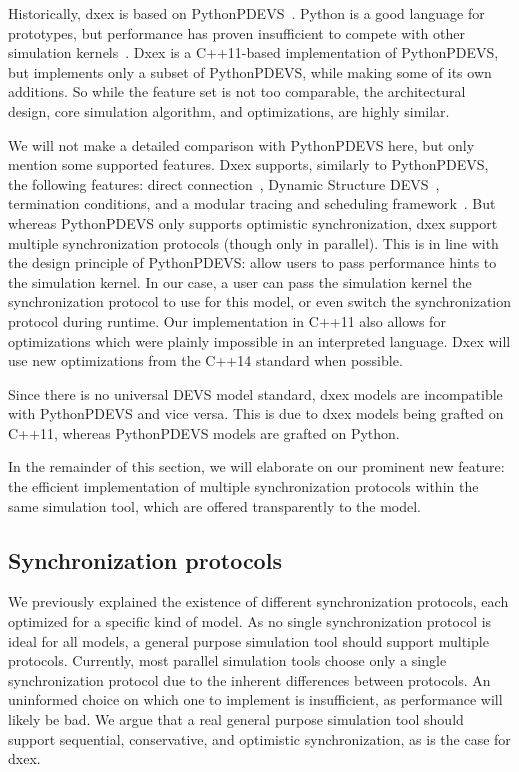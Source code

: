 \newcommand{\plotfraction}{0.85}
Historically, dxex is based on PythonPDEVS~\cite{PythonPDEVS}.
Python is a good language for prototypes, but performance has proven insufficient to compete with other simulation kernels~\cite{MasterThesis}.
Dxex is a C++11-based implementation of PythonPDEVS, but implements only a subset of PythonPDEVS, while making some of its own additions.
So while the feature set is not too comparable, the architectural design, core simulation algorithm, and optimizations, are highly similar.

We will not make a detailed comparison with PythonPDEVS here, but only mention some supported features.
Dxex supports, similarly to PythonPDEVS, the following features: direct connection~\cite{SymbolicFlattening}, \textsf{Dynamic Structure DEVS}~\cite{DSDEVS}, termination conditions, and a modular tracing and scheduling framework~\cite{PythonPDEVS}.
But whereas PythonPDEVS only supports optimistic synchronization, dxex support multiple synchronization protocols (though only in parallel).
This is in line with the design principle of PythonPDEVS: allow users to pass performance hints to the simulation kernel.
In our case, a user can pass the simulation kernel the synchronization protocol to use for this model, or even switch the synchronization protocol during runtime.
Our implementation in C++11 also allows for optimizations which were plainly impossible in an interpreted language. Dxex will use new optimizations from the C++14 standard when possible.

Since there is no universal \textsf{DEVS} model standard, dxex models are incompatible with PythonPDEVS and vice versa.
This is due to dxex models being grafted on C++11, whereas PythonPDEVS models are grafted on Python.

In the remainder of this section, we will elaborate on our prominent new feature: the efficient implementation of multiple synchronization protocols within the same simulation tool, which are offered transparently to the model.

\subsection{Synchronization protocols}
We previously explained the existence of different synchronization protocols, each optimized for a specific kind of model.
As no single synchronization protocol is ideal for all models, a general purpose simulation tool should support multiple protocols.
Currently, most parallel simulation tools choose only a single synchronization protocol due to the inherent differences between protocols.
An uninformed choice on which one to implement is insufficient, as performance will likely be bad.
We argue that a real general purpose simulation tool should support sequential, conservative, and optimistic synchronization, as is the case for dxex.

